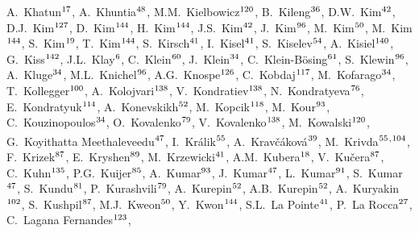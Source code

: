 \begin{flushleft}
A.~Khatun$^\textrm{\scriptsize 17}$,
A.~Khuntia$^\textrm{\scriptsize 48}$,
M.M.~Kielbowicz$^\textrm{\scriptsize 120}$,
B.~Kileng$^\textrm{\scriptsize 36}$,
D.W.~Kim$^\textrm{\scriptsize 42}$,
D.J.~Kim$^\textrm{\scriptsize 127}$,
D.~Kim$^\textrm{\scriptsize 144}$,
H.~Kim$^\textrm{\scriptsize 144}$,
J.S.~Kim$^\textrm{\scriptsize 42}$,
J.~Kim$^\textrm{\scriptsize 96}$,
M.~Kim$^\textrm{\scriptsize 50}$,
M.~Kim$^\textrm{\scriptsize 144}$,
S.~Kim$^\textrm{\scriptsize 19}$,
T.~Kim$^\textrm{\scriptsize 144}$,
S.~Kirsch$^\textrm{\scriptsize 41}$,
I.~Kisel$^\textrm{\scriptsize 41}$,
S.~Kiselev$^\textrm{\scriptsize 54}$,
A.~Kisiel$^\textrm{\scriptsize 140}$,
G.~Kiss$^\textrm{\scriptsize 142}$,
J.L.~Klay$^\textrm{\scriptsize 6}$,
C.~Klein$^\textrm{\scriptsize 60}$,
J.~Klein$^\textrm{\scriptsize 34}$,
C.~Klein-B\"{o}sing$^\textrm{\scriptsize 61}$,
S.~Klewin$^\textrm{\scriptsize 96}$,
A.~Kluge$^\textrm{\scriptsize 34}$,
M.L.~Knichel$^\textrm{\scriptsize 96}$,
A.G.~Knospe$^\textrm{\scriptsize 126}$,
C.~Kobdaj$^\textrm{\scriptsize 117}$,
M.~Kofarago$^\textrm{\scriptsize 34}$,
T.~Kollegger$^\textrm{\scriptsize 100}$,
A.~Kolojvari$^\textrm{\scriptsize 138}$,
V.~Kondratiev$^\textrm{\scriptsize 138}$,
N.~Kondratyeva$^\textrm{\scriptsize 76}$,
E.~Kondratyuk$^\textrm{\scriptsize 114}$,
A.~Konevskikh$^\textrm{\scriptsize 52}$,
M.~Kopcik$^\textrm{\scriptsize 118}$,
M.~Kour$^\textrm{\scriptsize 93}$,
C.~Kouzinopoulos$^\textrm{\scriptsize 34}$,
O.~Kovalenko$^\textrm{\scriptsize 79}$,
V.~Kovalenko$^\textrm{\scriptsize 138}$,
M.~Kowalski$^\textrm{\scriptsize 120}$,
G.~Koyithatta Meethaleveedu$^\textrm{\scriptsize 47}$,
I.~Kr\'{a}lik$^\textrm{\scriptsize 55}$,
A.~Krav\v{c}\'{a}kov\'{a}$^\textrm{\scriptsize 39}$,
M.~Krivda$^\textrm{\scriptsize 55}$\textsuperscript{,}$^\textrm{\scriptsize 104}$,
F.~Krizek$^\textrm{\scriptsize 87}$,
E.~Kryshen$^\textrm{\scriptsize 89}$,
M.~Krzewicki$^\textrm{\scriptsize 41}$,
A.M.~Kubera$^\textrm{\scriptsize 18}$,
V.~Ku\v{c}era$^\textrm{\scriptsize 87}$,
C.~Kuhn$^\textrm{\scriptsize 135}$,
P.G.~Kuijer$^\textrm{\scriptsize 85}$,
A.~Kumar$^\textrm{\scriptsize 93}$,
J.~Kumar$^\textrm{\scriptsize 47}$,
L.~Kumar$^\textrm{\scriptsize 91}$,
S.~Kumar$^\textrm{\scriptsize 47}$,
S.~Kundu$^\textrm{\scriptsize 81}$,
P.~Kurashvili$^\textrm{\scriptsize 79}$,
A.~Kurepin$^\textrm{\scriptsize 52}$,
A.B.~Kurepin$^\textrm{\scriptsize 52}$,
A.~Kuryakin$^\textrm{\scriptsize 102}$,
S.~Kushpil$^\textrm{\scriptsize 87}$,
M.J.~Kweon$^\textrm{\scriptsize 50}$,
Y.~Kwon$^\textrm{\scriptsize 144}$,
S.L.~La Pointe$^\textrm{\scriptsize 41}$,
P.~La Rocca$^\textrm{\scriptsize 27}$,
C.~Lagana Fernandes$^\textrm{\scriptsize 123}$,

\end{flushleft}
